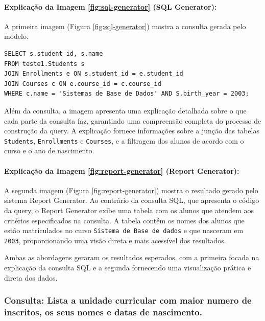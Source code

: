 \documentclass{article}
\begin{document}
\paragraph{Explicação da Imagem \ref{fig:sql-generator} (SQL Generator):}

A primeira imagem (Figura \ref{fig:sql-generator}) mostra a consulta gerada pelo modelo.

\begin{verbatim}
SELECT s.student_id, s.name
FROM teste1.Students s
JOIN Enrollments e ON s.student_id = e.student_id
JOIN Courses c ON e.course_id = c.course_id
WHERE c.name = 'Sistemas de Base de Dados' AND S.birth_year = 2003;
\end{verbatim}

Além da consulta, a imagem apresenta uma explicação detalhada sobre o que cada parte da consulta faz, garantindo uma compreensão completa do processo de construção da query. A explicação fornece informações sobre a junção das tabelas \texttt{Students}, \texttt{Enrollments} e \texttt{Courses}, e a filtragem dos alunos de acordo com o curso e o ano de nascimento.

\paragraph{Explicação da Imagem  \ref{fig:report-generator} (Report Generator):}

A segunda imagem (Figura \ref{fig:report-generator}) mostra o resultado gerado pelo sistema Report Generator. Ao contrário da consulta SQL, que apresenta o código da query, o Report Generator exibe uma tabela com os alunos que atendem aos critérios especificados na consulta. A tabela contém os nomes dos alunos que estão matriculados no curso \texttt{Sistema de Base de dados} e que nasceram em \texttt{2003}, proporcionando uma visão direta e mais acessível dos resultados.

Ambas as abordagens geraram os resultados esperados, com a primeira focada na explicação da consulta SQL e a segunda fornecendo uma visualização prática e direta dos dados.

\subsubsection{Consulta: Lista a unidade curricular com maior numero de inscritos, os seus nomes e datas de nascimento.}
\end{document}
